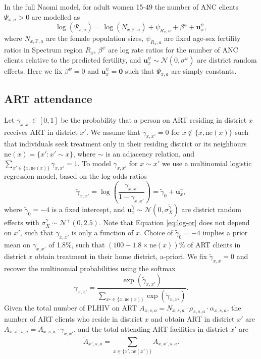 \documentclass[a4paper, nobind]{templates/ociamthesis}
\newcommand{\bu}{\mathbf{u}}
\begin{document}
In the full Naomi model, for adult women 15-49 the number of ANC clients \(\Psi_{x, a} > 0\) are modelled as
\[
\log (\Psi_{x, a}) = \log (N_{x, \text{F}, a}) + \psi_{R_x, a} + \beta^\psi + \bu_x^\psi,
\]
where \(N_{x, \text{F}, a}\) are the female population sizes, \(\psi_{R_x, a}\) are fixed age-sex fertility ratios in Spectrum region \(R_x\), \(\beta^\psi\) are log rate ratios for the number of ANC clients relative to the predicted fertility, and \(\bu_x^\psi \sim \mathcal{N}(0, \sigma^\psi)\) are district random effects.
Here we fix \(\beta^\psi = 0\) and \(\bu_x^\psi = \mathbf{0}\) such that \(\Psi_{x, a}\) are simply constants.

\hypertarget{art-attend}{%
\subsection{ART attendance}\label{art-attend}}

Let \(\gamma_{x, x'} \in [0, 1]\) be the probability that a person on ART residing in district \(x\) receives ART in district \(x'\).
We assume that \(\gamma_{x, x'} = 0\) for \(x \notin \{x, \text{ne}(x)\}\) such that individuals seek treatment only in their residing district or its neighbours \(\text{ne}(x) = \{x': x' \sim x\}\), where \(\sim\) is an adjacency relation, and \(\sum_{x' \in \{x, \text{ne}(x)\}} \gamma_{x, x'} = 1\).
To model \(\gamma_{x, x'}\) for \(x \sim x'\) we use a multinomial logistic regression model, based on the log-odds ratios
\begin{equation}
\tilde \gamma_{x, x'} = \log \left( \frac{\gamma_{x, x'}}{1 - \gamma_{x, x'}} \right) = \tilde \gamma_0 + \bu_x^{\tilde \gamma}, \label{eq:log-or}
\end{equation}
where \(\tilde \gamma_0 = -4\) is a fixed intercept, and \(\bu_x^{\tilde \gamma} \sim \mathcal{N}(0, \sigma_X^{\tilde \gamma})\) are district random effects with \(\sigma_X^{\tilde \gamma} \sim \mathcal{N}^+(0, 2.5)\).
Note that Equation \ref{eq:log-or} does not depend on \(x'\), such that \(\gamma_{x, x'}\) is only a function of \(x\).
Choice of \(\tilde \gamma_0 = -4\) implies a prior mean on \(\gamma_{x, x'}\) of 1.8\%, such that \((100 - 1.8 \times \text{ne}(x))\%\) of ART clients in district \(x\) obtain treatment in their home district, a-priori.
We fix \(\tilde \gamma_{x, x} = 0\) and recover the multinomial probabilities using the softmax
\begin{equation}
\gamma_{x, x'} = \frac{\exp(\tilde \gamma_{x, x'})}{\sum_{x^\star \in \{x, \text{ne}(x)\}} \exp(\tilde \gamma_{x, x^\star})}.
\end{equation}
Given the total number of PLHIV on ART \(A_{x, s, a} = N_{x, s, a} \cdot \rho_{x, s, a} \cdot \alpha_{x, s, a}\), the number of ART clients who reside in district \(x\) and obtain ART in district \(x'\) are \(A_{x, x', s, a} = A_{x, s, a} \cdot \gamma_{x, x'}\), and the total attending ART facilities in district \(x'\) are
\begin{equation}
\tilde A_{x', s, a} = \sum_{x \in \{x', \text{ne}(x')\}} A_{x, x', s, a}.
\end{equation}
\end{document}
